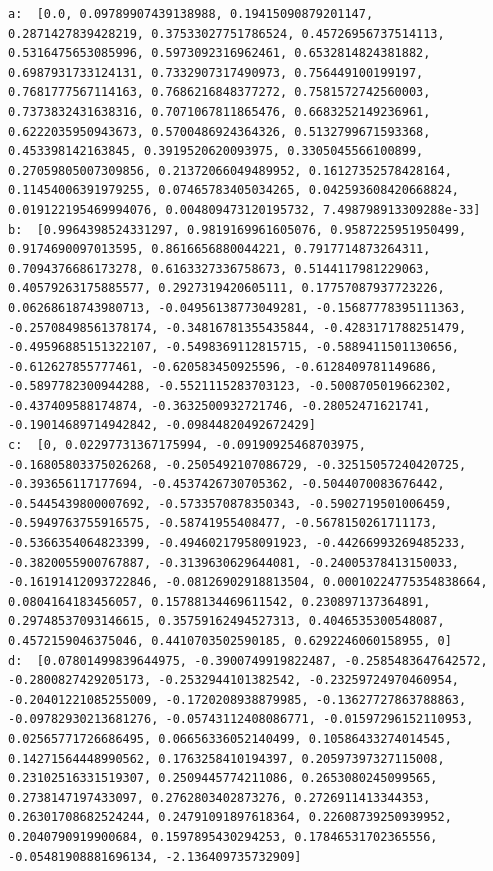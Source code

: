\documentclass[14pt, russian]{scrartcl}
\begin{document}
\begin{verbatim}
a:  [0.0, 0.09789907439138988, 0.19415090879201147, 0.2871427839428219, 0.37533027751786524, 0.45726956737514113, 0.5316475653085996, 0.5973092316962461, 0.6532814824381882, 0.6987931733124131, 0.7332907317490973, 0.756449100199197, 0.7681777567114163, 0.7686216848377272, 0.7581572742560003, 0.7373832431638316, 0.7071067811865476, 0.6683252149236961, 0.6222035950943673, 0.5700486924364326, 0.5132799671593368, 0.453398142163845, 0.3919520620093975, 0.3305045566100899, 0.27059805007309856, 0.21372066049489952, 0.16127352578428164, 0.11454006391979255, 0.07465783405034265, 0.042593608420668824, 0.019122195469994076, 0.004809473120195732, 7.498798913309288e-33]
b:  [0.9964398524331297, 0.9819169961605076, 0.9587225951950499, 0.9174690097013595, 0.8616656880044221, 0.7917714873264311, 0.7094376686173278, 0.6163327336758673, 0.5144117981229063, 0.40579263175885577, 0.2927319420605111, 0.17757087937723226, 0.06268618743980713, -0.04956138773049281, -0.15687778395111363, -0.25708498561378174, -0.34816781355435844, -0.4283171788251479, -0.49596885151322107, -0.5498369112815715, -0.5889411501130656, -0.612627855777461, -0.620583450925596, -0.6128409781149686, -0.5897782300944288, -0.5521115283703123, -0.5008705019662302, -0.437409588174874, -0.3632500932721746, -0.28052471621741, -0.19014689714942842, -0.09844820492672429]
c:  [0, 0.02297731367175994, -0.09190925468703975, -0.16805803375026268, -0.2505492107086729, -0.32515057240420725, -0.393656117177694, -0.4537426730705362, -0.5044070083676442, -0.5445439800007692, -0.5733570878350343, -0.5902719501006459, -0.5949763755916575, -0.58741955408477, -0.5678150261711173, -0.5366354064823399, -0.49460217958091923, -0.44266993269485233, -0.3820055900767887, -0.3139630629644081, -0.24005378413150033, -0.16191412093722846, -0.08126902918813504, 0.00010224775354838664, 0.0804164183456057, 0.15788134469611542, 0.230897137364891, 0.29748537093146615, 0.35759162494527313, 0.4046535300548087, 0.4572159046375046, 0.4410703502590185, 0.6292246060158955, 0]
d:  [0.07801499839644975, -0.3900749919822487, -0.2585483647642572, -0.2800827429205173, -0.2532944101382542, -0.23259724970460954, -0.20401221085255009, -0.1720208938879985, -0.13627727863788863, -0.09782930213681276, -0.05743112408086771, -0.01597296152110953, 0.02565771726686495, 0.06656336052140499, 0.10586433274014545, 0.14271564448990562, 0.1763258410194397, 0.20597397327115008, 0.23102516331519307, 0.2509445774211086, 0.2653080245099565, 0.2738147197433097, 0.2762803402873276, 0.2726911413344353, 0.26301708682524244, 0.24791091897618364, 0.22608739250939952, 0.2040790919900684, 0.1597895430294253, 0.17846531702365556, -0.05481908881696134, -2.136409735732909]


\end{verbatim}
\end{document}
